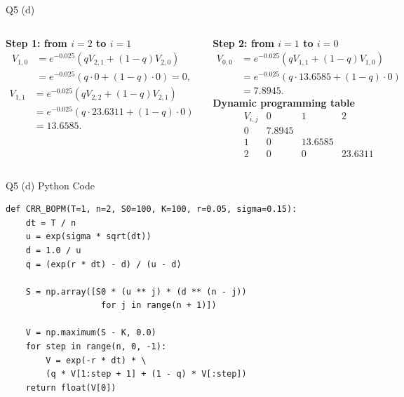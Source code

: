 \documentclass{beamer}
\begin{document}
\begin{frame}{Q5 (d)}
\footnotesize
\begin{columns}[T,onlytextwidth]
\textbf{Step 1: from \(i=2\) to \(i=1\)}
\[
\begin{aligned}
V_{1,0}
&=e^{-0.025}
  \left(qV_{2,1}+(1-q)V_{2,0}\right)\\
&=e^{-0.025}\left(q\cdot0+(1-q)\cdot0\right)
=0,
\end{aligned}
\]
\[
\begin{aligned}
V_{1,1}
&=e^{-0.025}
  \left(qV_{2,2}+(1-q)V_{2,1}\right)\\
&=e^{-0.025}\left(q\cdot23.6311+(1-q)\cdot0\right)\\
&=13.6585.
\end{aligned}
\]

\textbf{Step 2: from \(i=1\) to \(i=0\)}
\[
\begin{aligned}
V_{0,0}
&=e^{-0.025}
  \left(qV_{1,1}+(1-q)V_{1,0}\right)\\
&=e^{-0.025}\left(q\cdot13.6585+(1-q)\cdot0\right)\\
&=\boxed{7.8945}.
\end{aligned}
\]
\centering
\textbf{Dynamic programming table}
\small
\renewcommand{\arraystretch}{1}
\[
\begin{array}{c|ccc}
V_{i, j} & 0 & 1 & 2\\
\hline
0 & \boxed{7.8945} & & \\[2pt]
1 & 0 & 13.6585 & \\[2pt]
2 & 0 & 0 & 23.6311
\end{array}
\]
\end{columns}
\end{frame}


\begin{frame}[fragile]{Q5 (d) Python Code}
\footnotesize
\begin{lstlisting}
def CRR_BOPM(T=1, n=2, S0=100, K=100, r=0.05, sigma=0.15):
    dt = T / n
    u = exp(sigma * sqrt(dt))
    d = 1.0 / u
    q = (exp(r * dt) - d) / (u - d)

    S = np.array([S0 * (u ** j) * (d ** (n - j))
                   for j in range(n + 1)])

    V = np.maximum(S - K, 0.0)
    for step in range(n, 0, -1):
        V = exp(-r * dt) * \
        (q * V[1:step + 1] + (1 - q) * V[:step])
    return float(V[0])
\end{lstlisting}
\end{frame}
\end{document}
